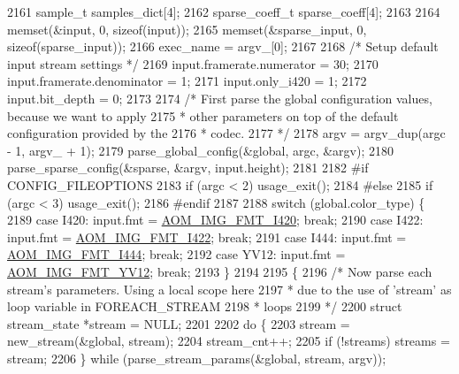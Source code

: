 \begin{DoxyCodeInclude}
{{{{{{{{{{{{{{{{{{{{{{{{{{{{{{{{{{{{{{{{{{{{{{{{{{{{{{{{{{{{{2161   sample\_t samples\_dict[4];
2162   sparse\_coeff\_t sparse\_coeff[4];
2163 
2164   memset(&input, 0, \textcolor{keyword}{sizeof}(input));
2165   memset(&sparse\_input, 0, \textcolor{keyword}{sizeof}(sparse\_input));
2166   exec\_name = argv\_[0];
2167 
2168   \textcolor{comment}{/* Setup default input stream settings */}
2169   input.framerate.numerator = 30;
2170   input.framerate.denominator = 1;
2171   input.only\_i420 = 1;
2172   input.bit\_depth = 0;
2173 
2174   \textcolor{comment}{/* First parse the global configuration values, because we want to apply}
2175 \textcolor{comment}{   * other parameters on top of the default configuration provided by the}
2176 \textcolor{comment}{   * codec.}
2177 \textcolor{comment}{   */}
2178   argv = argv\_dup(argc - 1, argv\_ + 1);
2179   parse\_global\_config(&global, argc, &argv);
2180   parse\_sparse\_config(&sparse, &argv, input.height);
2181 
2182 \textcolor{preprocessor}{#if CONFIG\_FILEOPTIONS}
2183   \textcolor{keywordflow}{if} (argc < 2) usage\_exit();
2184 \textcolor{preprocessor}{#else}
2185   \textcolor{keywordflow}{if} (argc < 3) usage\_exit();
2186 \textcolor{preprocessor}{#endif}
2187 
2188   \textcolor{keywordflow}{switch} (global.color\_type) \{
2189   \textcolor{keywordflow}{case} I420: input.fmt = \hyperlink{aom__image_8h_a930317c04b4bd0a660bb5e744055523cabd778a3d697463e89d12a1117f417b60}{AOM\_IMG\_FMT\_I420}; \textcolor{keywordflow}{break};
2190   \textcolor{keywordflow}{case} I422: input.fmt = \hyperlink{aom__image_8h_a930317c04b4bd0a660bb5e744055523cab2f75281e94ebc0f0bc728ef287cd3e8}{AOM\_IMG\_FMT\_I422}; \textcolor{keywordflow}{break};
2191   \textcolor{keywordflow}{case} I444: input.fmt = \hyperlink{aom__image_8h_a930317c04b4bd0a660bb5e744055523ca89d423506e948ab7d3b98b5750b92655}{AOM\_IMG\_FMT\_I444}; \textcolor{keywordflow}{break};
2192   \textcolor{keywordflow}{case} YV12: input.fmt = \hyperlink{aom__image_8h_a930317c04b4bd0a660bb5e744055523cad28244100a2754409f285b77a3db90a0}{AOM\_IMG\_FMT\_YV12}; \textcolor{keywordflow}{break};
2193   \}
2194 
2195   \{
2196     \textcolor{comment}{/* Now parse each stream's parameters. Using a local scope here}
2197 \textcolor{comment}{     * due to the use of 'stream' as loop variable in FOREACH\_STREAM}
2198 \textcolor{comment}{     * loops}
2199 \textcolor{comment}{     */}
2200     \textcolor{keyword}{struct }stream\_state *stream = NULL;
2201 
2202     \textcolor{keywordflow}{do} \{
2203       stream = new\_stream(&global, stream);
2204       stream\_cnt++;
2205       \textcolor{keywordflow}{if} (!streams) streams = stream;
2206     \} \textcolor{keywordflow}{while} (parse\_stream\_params(&global, stream, argv));
}}}}}}}}}}}}}}}}}}}}}}}}}}}}}}}}}}}}}}}}}}}}}}}}}}}}}}}}}}}}}
\end{DoxyCodeInclude}
